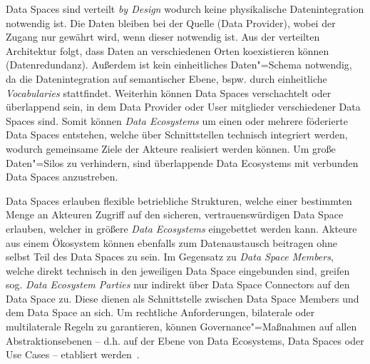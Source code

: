 Data Spaces sind verteilt \emph{by Design} wodurch keine physikalische Datenintegration notwendig ist.
Die Daten bleiben bei der Quelle (Data Provider), wobei der Zugang nur gewährt wird, wenn dieser notwendig ist.
Aus der verteilten Architektur folgt, dass Daten an verschiedenen Orten koexistieren können (Datenredundanz).
Außerdem ist kein einheitliches Daten"=Schema notwendig, da die Datenintegration auf semantischer Ebene, bspw. durch einheitliche \emph{Vocabularies} stattfindet.
Weiterhin können Data Spaces verschachtelt oder überlappend sein, in dem Data Provider oder User mitglieder verschiedener Data Spaces sind.
Somit können \emph{Data Ecosystems} um einen oder mehrere föderierte Data Spaces entstehen, welche über Schnittstellen technisch integriert werden, wodurch gemeinsame Ziele der Akteure realisiert werden können.
Um große Daten"=Silos zu verhindern, sind überlappende Data Ecosystems mit verbunden Data Spaces anzustreben.

Data Spaces erlauben flexible betriebliche Strukturen, welche einer bestimmten Menge an Akteuren Zugriff auf den sicheren, vertrauenswürdigen Data Space erlauben, welcher in größere \emph{Data Ecosystems} eingebettet werden kann.
Akteure aus einem Ökosystem können ebenfalls zum Datenaustausch beitragen ohne selbst Teil des Data Spaces zu sein.
Im Gegensatz zu \emph{Data Space Members}, welche direkt technisch in den jeweiligen Data Space eingebunden sind, greifen sog. \emph{Data Ecosystem Parties} nur indirekt über Data Space Connectors auf den Data Space zu. %
Diese dienen als Schnittstelle zwischen Data Space Members und dem Data Space an sich.
Um rechtliche Anforderungen, bilaterale oder multilaterale Regeln zu garantieren, können Governance"=Maßnahmen auf allen Abstraktionsebenen -- d.h. auf der Ebene von Data Ecosystems, Data Spaces oder Use Cases -- etabliert werden~\cite{mollerIndustrialDataEcosystems2024}.

